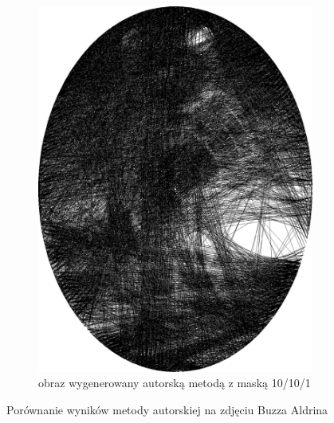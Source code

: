 \begin{figure}[H]
\begin{subfigure}{0.24\textwidth}
        \includegraphics[width = \textwidth]{img/6-comp/aldrin_e_i3500_c20_inv0_bg10_obj10_ed1.png}
        \caption{obraz wygenerowany autorską metodą z maską 10/10/1}
        \label{comp-comp-aldrin-h}
    \end{subfigure}
    \caption{Porównanie wyników metody autorskiej na zdjęciu Buzza Aldrina}
    \label{comp-comp-aldrin}
    \end{figure}
    
